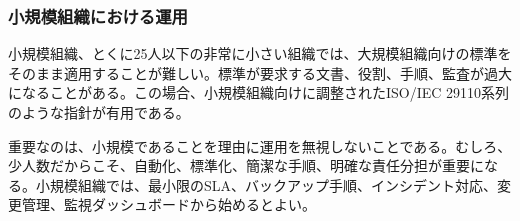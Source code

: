 \subsubsection{小規模組織における運用}

小規模組織、とくに25人以下の非常に小さい組織では、大規模組織向けの標準をそのまま適用することが難しい。標準が要求する文書、役割、手順、監査が過大になることがある。この場合、小規模組織向けに調整されたISO/IEC 29110系列のような指針が有用である。

重要なのは、小規模であることを理由に運用を無視しないことである。むしろ、少人数だからこそ、自動化、標準化、簡潔な手順、明確な責任分担が重要になる。小規模組織では、最小限のSLA、バックアップ手順、インシデント対応、変更管理、監視ダッシュボードから始めるとよい。
